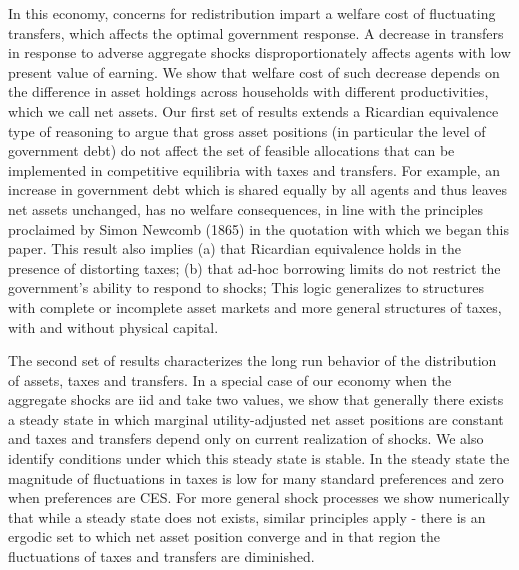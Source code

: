 \documentclass[thmsb,11pt]{article}
\begin{document}
In this economy, concerns for redistribution impart a welfare cost of fluctuating transfers, which affects the optimal government response. A decrease in transfers in response to adverse aggregate shocks disproportionately affects agents with low present value of earning. We show that welfare cost of such decrease depends on the difference in asset holdings across households with different productivities, which we call net assets. Our first set of results extends a Ricardian equivalence type of reasoning to argue that gross asset positions (in particular the level of government debt) do not affect the set of feasible allocations that can be implemented in competitive equilibria with taxes and transfers. For example, an increase in government debt which is shared equally by all agents and thus leaves net assets unchanged,  has no welfare consequences, in line with the principles proclaimed by Simon Newcomb (1865)  in the quotation with which we began this paper. This result also implies (a) that Ricardian 
equivalence holds in the presence of
distorting  taxes; (b) that ad-hoc borrowing limits do not restrict the government's ability to respond to shocks; 
This logic generalizes to structures with complete or incomplete asset markets and more general structures of taxes, with and without physical
capital.



The second set of results characterizes the long run behavior of the distribution of assets, taxes and transfers. In a special case of our economy when the aggregate shocks are iid and take two values, we show that generally there exists a steady state in which marginal utility-adjusted net asset positions are constant and taxes and transfers depend only on current realization of shocks. We also identify conditions under which this steady state is stable. In the steady state the magnitude of fluctuations in taxes is low for many standard preferences and zero when preferences are CES. For more general shock processes we show numerically that while a steady state does not exists, similar principles apply - there is an ergodic set to which net asset position converge and in that region the fluctuations of taxes and transfers are diminished. 
\end{document}
